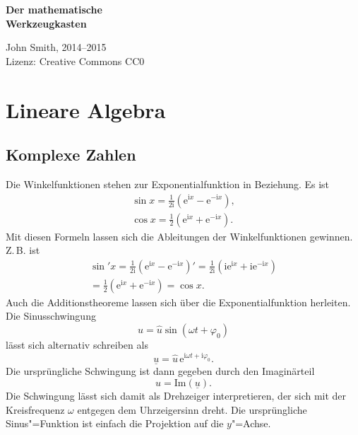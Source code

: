 \documentclass[a4paper,10pt,fleqn,twocolumn,twoside]{article}
\newcommand{\ui}{\mathrm i}
\newcommand{\ee}{\mathrm e}
\begin{document}

\begin{huge}
\noindent
\textbf{Der mathematische\\
Werkzeugkasten}
\par
\end{huge}
\vspace{1em}
\noindent
John Smith, 2014--2015\\
Lizenz: Creative Commons CC0

\tableofcontents



\newpage
\section{Lineare Algebra}
\subsection{Komplexe Zahlen}

Die Winkelfunktionen stehen zur Exponentialfunktion
in Beziehung. Es ist
\begin{gather}
\sin x = \frac{1}{2\ui}(\mathrm{e}^{\ui x}-\mathrm{e}^{-\ui x}),\\
\cos x = \frac{1}{2}(\mathrm{e}^{\ui x}+\mathrm{e}^{-\ui x}).
\end{gather}
Mit diesen Formeln lassen sich die Ableitungen der Winkelfunktionen
gewinnen. Z.\,B. ist
\begin{gather}
\sin' x = \frac{1}{2\ui}(\ee^{\ui x}-\ee^{-\ui x})'
= \frac{1}{2\ui}(\ui\ee^{\ui x}+\ui\ee^{-\ui x})\\
= \frac{1}{2}(\ee^{\ui x}+\ee^{-\ui x})
= \cos x.
\end{gather}
Auch die Additionstheoreme lassen sich über die Exponentialfunktion
herleiten. Die Sinusschwingung
\begin{equation}
u = \hat u\sin(\omega t+\varphi_0)
\end{equation}
lässt sich alternativ schreiben als
\begin{equation}
\underline u = \hat u\,\ee^{\ui\omega t+\ui\varphi_0}.
\end{equation}
Die ursprüngliche Schwingung ist dann gegeben durch den Imaginärteil
\begin{equation}
u = \mathrm{Im}(\underline u).
\end{equation}
Die Schwingung lässt sich damit als Drehzeiger interpretieren, der
sich mit der Kreisfrequenz $\omega$ entgegen dem Uhrzeigersinn
dreht. Die ursprüngliche Sinus"=Funktion ist einfach die Projektion
auf die $y$"=Achse.
\end{document}
